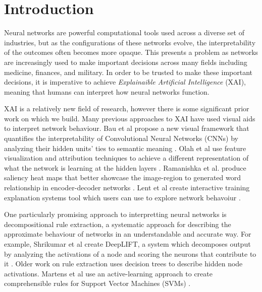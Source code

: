 \section{Introduction}

\label{sec:intro}

Neural networks are powerful computational tools used across a diverse set of industries, but as the configurations of these networks evolve, the interpretability of the outcomes often becomes more opaque. This presents a problem as networks are increasingly used to make important decisions across many fields including medicine, finances, and military. In order to be trusted to make these important decisions, it is imperative to achieve \textit{Explainaible Artificial Intelligence} (XAI), meaning that humans can interpret how neural networks function.

XAI is a relatively new field of research, however there is some significant prior work on which we build. Many previous approaches to XAI have used visual aids to interpret network behaviour. Bau et al propose a new visual framework that quantifies the interpretability of Convolutional Neural Networks (CNNs) by analyzing their hidden units’ ties to semantic meaning \cite{bau2017network}. Olah et al use feature visualization and attribution techniques to achieve a different representation of what the network is learning at the hidden layers \cite{ olah2018the}. Ramanishka et al. produce saliency heat maps that better showcase the image-region to generated word relationship in encoder-decoder networks \cite{ramanishka2017top}. Lent et al create interactive training explanation systems tool which users can use to explore network behavoiur \cite{van2004explainable}.

One particularly promising approach to interpretting neural networks is decompositional rule extraction, a systematic approach for describing the approximate behaviour of networks in an understandable and accurate way. For example, Shrikumar et al create DeepLIFT, a system which decomposes output by analyzing the activations of a node and scoring the neurons that contribute to it \cite{shrikumar2017learning}. Older work on rule extraction \cite{duch2001new, tsukimoto2000extracting} uses decision trees \cite{ baehrens2010explain} to describe hidden node activations. Martens et al use an
active-learning approach to create comprehensible rules for Support Vector Machines (SVMs) \cite{martens2009decompositional}.

